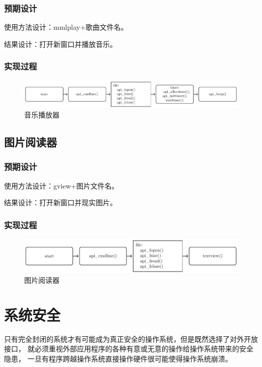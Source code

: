     \subsubsection{预期设计}

    使用方法设计：mmlplay+歌曲文件名。

    结果设计：打开新窗口并播放音乐。
    \subsubsection{实现过程}
    \begin{figure}[h]
        \centering
        \includegraphics[width=.8\textwidth]{../Fig/api/mmlplay.pdf}
        \caption{音乐播放器}
        \label{fig:btss}
      \end{figure}

\subsection{图片阅读器}
    \subsubsection{预期设计}

    使用方法设计：gview+图片文件名。

    结果设计：打开新窗口并现实图片。
    \subsubsection{实现过程}
    \begin{figure}[h]
        \centering
        \includegraphics[width=.8\textwidth]{../Fig/api/gview.pdf}
        \caption{图片阅读器}
        \label{fig:btss}
      \end{figure}

\section{系统安全}

只有完全封闭的系统才有可能成为真正安全的操作系统，但是既然选择了对外开放接口，
就必须重视外部应用程序的各种有意或无意的操作给操作系统带来的安全隐患，
一旦有程序跨越操作系统直接操作硬件很可能使得操作系统崩溃。

